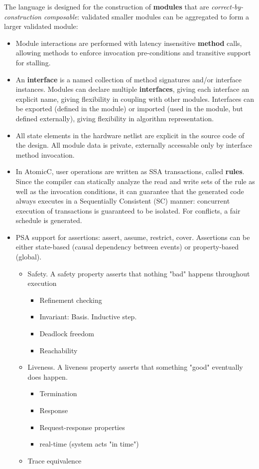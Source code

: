 The language is designed for
the construction of \textbf{modules} that are \textit{correct-by-construction composable}:
validated smaller modules can be aggregated to form
a larger validated module:
\begin{itemize}

\item Module interactions are performed with
latency insensitive
\textbf{method} calls, allowing methods to enforce invocation pre-conditions
and transitive support for stalling.

\item An \textbf{interface} is a named collection of method signatures and/or interface instances.
Modules can declare
multiple \textbf{interfaces}, giving each interface an explicit name,
giving flexibility in coupling with other modules.
Interfaces can be exported (defined in the module) or imported (used in
the module, but defined externally), giving flexibility in algorithm
representation.

\item All state elements in the hardware
netlist are explicit in the source code of the design.
All module data is private, externally accessable only by interface method invocation.

\item In AtomicC, user operations are written as SSA transactions, called \textbf{rules}.  Since the
compiler can statically analyze the read and write sets of the rule as well as the
invocation conditions, it can guarantee that the generated code always executes
in a Sequentially Consistent (SC) manner: concurrent execution of transactions is
guaranteed to be isolated.  For conflicts, a fair schedule is generated.

\item PSA support for assertions: assert, assume, restrict, cover.
Assertions can be either state-based (causal dependency between events) or
property-based (global).
\begin{itemize}
\item Safety. A safety property asserts that nothing "bad" happens throughout execution
\begin{itemize}
\setlength\itemsep{-0.5em}
\item Refinement checking
\item Invariant:  Basis.  Inductive step.
\item Deadlock freedom
\item Reachability
\end{itemize}
\item Liveness. A liveness property asserts that something "good" eventually does happen.
\begin{itemize}
\setlength\itemsep{-0.5em}
\item Termination
\item Response
\item Request-response properties
\item real-time (system acts "in time")
\end{itemize}
\item Trace equivalence
\end{itemize}


\end{itemize}
